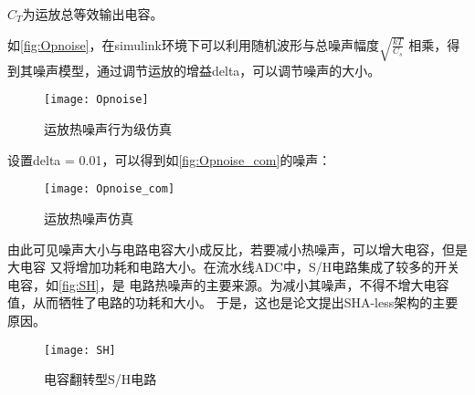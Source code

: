     \par $ C_T $为运放总等效输出电容。
    \par 如\autoref{fig:Opnoise}，在simulink环境下可以利用随机波形与总噪声幅度$ \sqrt{\frac{kT}{C_s}} $
    相乘，得到其噪声模型，通过调节运放的增益delta，可以调节噪声的大小。
    \begin{figure}[H]
        \centering
        \texttt{[image: Opnoise]}
        \caption{\label{fig:Opnoise}运放热噪声行为级仿真}
    \end{figure}
    \par 设置delta = 0.01，可以得到如\autoref{fig:Opnoise_com}的噪声：
    \begin{figure}[H]
        \centering
        \texttt{[image: Opnoise\_com]}
        \caption{\label{fig:Opnoise_com}运放热噪声仿真}
    \end{figure}
    \par 由此可见噪声大小与电路电容大小成反比，若要减小热噪声，可以增大电容，但是大电容
    又将增加功耗和电路大小。在流水线ADC中，S/H电路集成了较多的开关电容，如\autoref{fig:SH}，是
    电路热噪声的主要来源。为减小其噪声，不得不增大电容值，从而牺牲了电路的功耗和大小。
    于是，这也是论文提出SHA-less架构的主要原因。
    \begin{figure}[H]
        \centering
        \texttt{[image: SH]}
        \caption{\label{fig:SH}电容翻转型S/H电路}
    \end{figure}
    
